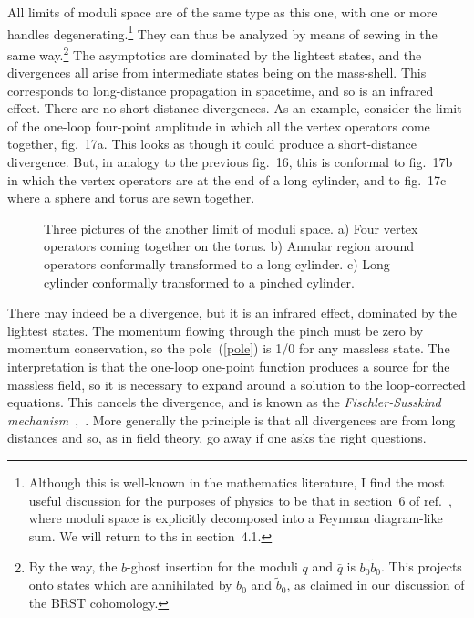 All limits of moduli space are of the same type as this one, with
one or more handles degenerating.\footnote
{Although this is well-known in the mathematics literature, I find
the most useful discussion for the purposes of physics to be that
in section~6 of ref.~\cite{Zsft}, where moduli space is explicitly
decomposed into a Feynman diagram-like sum.  We will return to ths
in section~4.1.}
They can thus be analyzed
by means of sewing in the same way.\footnote
{By the way, the $b$-ghost insertion for the moduli $q$ and $\bar
q$ is $b_0 \tilde b_0$.  This projects onto states which are
annihilated by $b_0$ and $\tilde b_0$, as claimed in our
discussion of the BRST cohomology.}
The asymptotics are
dominated by the lightest states, and the divergences all arise from
intermediate states being on the mass-shell.  This corresponds to
long-distance propagation in spacetime, and so is an infrared
effect.  There are no short-distance divergences.  As an example,
consider the limit of the one-loop four-point amplitude in which
all the vertex operators come together, fig.~17a.  This looks as though
it could produce a short-distance divergence.  But, in analogy to the
previous fig.~16, this is conformal to fig.~17b in which the
vertex operators are at the end of a long cylinder, and to
fig.~17c where a sphere and torus are sewn together. 
\begin{figure}
\begin{center}
\leavevmode
{}
\end{center}
\caption[]{Three pictures of the another limit of moduli space.
a) Four vertex operators coming together on the torus.
b) Annular region around operators conformally transformed to a long
cylinder.  c) Long cylinder conformally transformed to a pinched 
cylinder.}
\end{figure}
There may indeed be a divergence, but it is an infrared effect,
dominated by the lightest states.  The momentum flowing through
the pinch must be zero by momentum conservation, so the
pole~(\ref{pole}) is 1/0 for any massless state.  The interpretation
is that the one-loop one-point function produces a source for the
massless field, so it is necessary to expand around a solution to
the loop-corrected equations.  This cancels the divergence, and is
known as the {\it Fischler-Susskind
mechanism}~\cite{FS},~\cite{Psew}.  More
generally the principle is that all divergences are from long
distances and so, as in field theory, go away if one asks the right
questions. 

